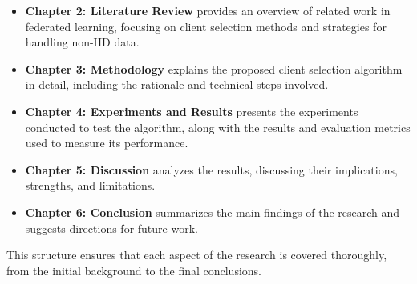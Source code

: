 \begin{itemize}
    \item \textbf{Chapter 2: Literature Review} provides an overview of related work in federated learning, focusing on client selection methods and strategies for handling non-IID data.
    \item \textbf{Chapter 3: Methodology} explains the proposed client selection algorithm in detail, including the rationale and technical steps involved.
    \item \textbf{Chapter 4: Experiments and Results} presents the experiments conducted to test the algorithm, along with the results and evaluation metrics used to measure its performance.
    \item \textbf{Chapter 5: Discussion} analyzes the results, discussing their implications, strengths, and limitations.
    \item \textbf{Chapter 6: Conclusion} summarizes the main findings of the research and suggests directions for future work.
\end{itemize}

This structure ensures that each aspect of the research is covered thoroughly, from the initial background to the final conclusions.

